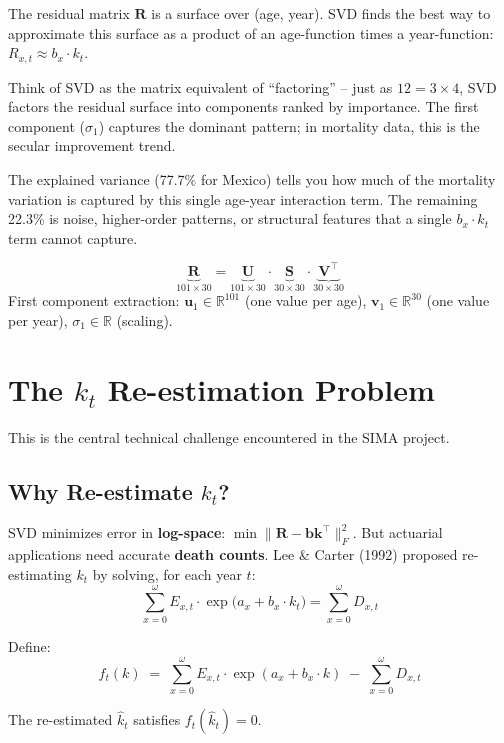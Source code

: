 \documentclass[11pt,a4paper]{article}
\theoremstyle{definition}
\newcommand{\R}{\mathbb{R}}
\begin{document}
\begin{intuition}
The residual matrix $\bm{R}$ is a surface over (age, year). SVD finds
the best way to approximate this surface as a product of an age-function
times a year-function: $R_{x,t} \approx b_x \cdot k_t$.

Think of SVD as the matrix equivalent of ``factoring'' -- just as $12 = 3 \times 4$,
SVD factors the residual surface into components ranked by importance.
The first component ($\sigma_1$) captures the dominant pattern; in mortality
data, this is the secular improvement trend.

The explained variance (77.7\% for Mexico) tells you how much of the
mortality variation is captured by this single age-year interaction term.
The remaining 22.3\% is noise, higher-order patterns, or structural
features that a single $b_x \cdot k_t$ term cannot capture.
\end{intuition}

\begin{dimcheck}
\[
  \underbrace{\bm{R}}_{101 \times 30}
  = \underbrace{\bm{U}}_{101 \times 30}
  \cdot \underbrace{\bm{S}}_{30 \times 30}
  \cdot \underbrace{\bm{V}^\top}_{30 \times 30}
\]
First component extraction:
$\bm{u}_1 \in \R^{101}$ (one value per age),
$\bm{v}_1 \in \R^{30}$ (one value per year),
$\sigma_1 \in \R$ (scaling).
\end{dimcheck}

\section{The $k_t$ Re-estimation Problem}
\label{sec:reestimation}

This is the central technical challenge encountered in the SIMA project.

\subsection{Why Re-estimate $k_t$?}

\begin{formaldef}
SVD minimizes error in \textbf{log-space}:
$\min \|\bm{R} - \bm{b}\bm{k}^\top\|_F^2$.
But actuarial applications need accurate \textbf{death counts}.
Lee \& Carter (1992) proposed re-estimating $k_t$ by solving, for each year $t$:
\begin{equation}
  \boxed{
    \sum_{x=0}^{\omega} E_{x,t} \cdot \exp\!\bigl(a_x + b_x \cdot k_t\bigr)
    = \sum_{x=0}^{\omega} D_{x,t}
  }
  \label{eq:reestimation}
\end{equation}

Define:
\begin{equation}
  f_t(k) \;=\; \sum_{x=0}^{\omega} E_{x,t} \cdot \exp(a_x + b_x \cdot k)
  \;-\; \sum_{x=0}^{\omega} D_{x,t}
  \label{eq:death-residual}
\end{equation}

The re-estimated $\hat{k}_t$ satisfies $f_t(\hat{k}_t) = 0$.
\end{formaldef}
\end{document}
